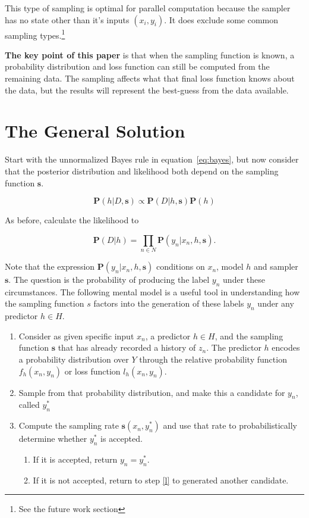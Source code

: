 \documentclass[twoside]{article}
\begin{document}
This type of sampling is optimal for parallel computation because the sampler has no state other than it's inputs \((x_i, y_i)\). It does exclude some common sampling types.\footnote{See the future work section}

\textbf{The key point of this paper} is that when the sampling function is known, a probability distribution and loss function can still be computed from the remaining data. The sampling affects what that final loss function knows about the data, but the results will represent the best-guess from the data available.

\section{The General Solution}
\label{section:solution}

Start with the unnormalized Bayes rule in equation~\eqref{eq:bayes}, but now consider that the posterior distribution and likelihood both depend on the sampling function \(\mathbf{s}\).

\[\mathbf{P}(h|D,\mathbf{s})\propto\mathbf{P}(D|h,\mathbf{s})\mathbf{P}(h)\]

As before, calculate the likelihood to

\[\mathbf{P}(D|h)=\prod_{n \in N} \mathbf{P}(y_n|x_n,h,\mathbf{s}).\]

Note that the expression \(\mathbf{P}(y_n|x_n,h,\mathbf{s})\) conditions on \(x_n\), model \(h\) and sampler \(\mathbf{s}\). The question is the probability of producing the label \(y_n\) under these circumstances. The following mental model is a useful tool in understanding how the sampling function \(s\) factors into the generation of these labels \(y_n\) under any predictor \(h \in H\).

\begin{enumerate}
	\item Consider as given specific input \(x_n\), a predictor \(h \in H\), and the sampling function \(\mathbf{s}\) that has already recorded a history of \(z_n\). The predictor \(h\) encodes a probability distribution over \(Y\) through the relative probability function \(f_h(x_n,y_n)\) or loss function \(l_h(x_n,y_n)\).
	\item \label{l} Sample from that probability distribution, and make this a candidate for \(y_n\), called \(y_n^*\)
	\item Compute the sampling rate \(\mathbf{s}(x_n,y_n^*)\) and use that rate to probabilistically determine whether \(y_n^*\) is accepted.
    \begin{enumerate}
        \item If it is accepted, return \(y_n=y_n^*\).
        \item If it is not accepted, return to step \ref{l} to generated another candidate.
    \end{enumerate}
\end{enumerate}
\end{document}
